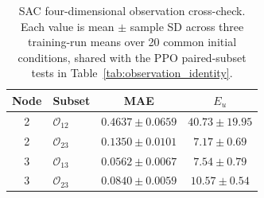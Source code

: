 \begin{table}[pos=htbp,width=\linewidth]
\centering\small
\setlength{\tabcolsep}{3pt}
\caption{SAC four-dimensional observation cross-check. Each value is mean $\pm$ sample SD across three training-run means over 20 common initial conditions, shared with the PPO paired-subset tests in Table~\ref{tab:observation_identity}.}
\label{tab:sac_observation_check}
\begin{tabular}{@{}clcc@{}}
\toprule
Node & Subset & MAE & $E_u$ \\
\midrule
2 & $\mathcal O_{12}$ & $0.4637\pm0.0659$ & $40.73\pm19.95$ \\
2 & $\mathcal O_{23}$ & $0.1350\pm0.0101$ & $7.17\pm0.69$ \\
3 & $\mathcal O_{13}$ & $0.0562\pm0.0067$ & $7.54\pm0.79$ \\
3 & $\mathcal O_{23}$ & $0.0840\pm0.0059$ & $10.57\pm0.54$ \\
\bottomrule
\end{tabular}
\end{table}

